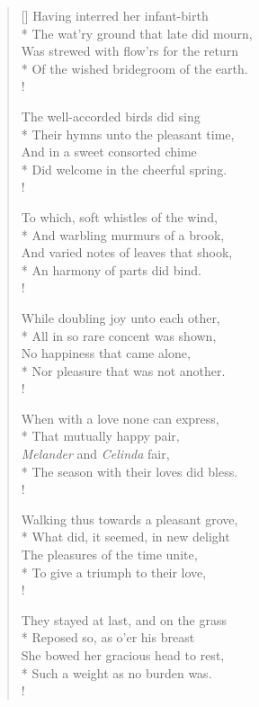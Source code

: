 \documentclass[MAIN]{subfiles}
\begin{document}
\settowidth{\versewidth}{\vin Was strewed with flow'rs for the return}
\begin{verse}[\versewidth]
Having interred her infant-birth\\*
\vin The wat'ry ground that late did mourn,\\
\vin Was strewed with flow'rs for the return\\*
Of the wished bridegroom of the earth.\\!

The well-accorded birds did sing\\*
\vin Their hymns unto the pleasant time,\\
\vin And in a sweet consorted chime\\*
Did welcome in the cheerful spring.\\!

To which, soft whistles of the wind,\\*
\vin And warbling murmurs of a brook,\\
\vin And varied notes of leaves that shook,\\*
An harmony of parts did bind.\\!

While doubling joy unto each other,\\*
\vin All in so rare concent was shown,\\
\vin No happiness that came alone,\\*
Nor pleasure that was not another.\\!

When with a love none can express,\\*
\vin That mutually happy pair,\\
\vin \emph{Melander} and \emph{Celinda} fair,\\*
The season with their loves did bless.\\!

Walking thus towards a pleasant grove,\\*
\vin What did, it seemed, in new delight\\
\vin The pleasures of the time unite,\\*
To give a triumph to their love,\\!

They stayed at last, and on the grass\\*
\vin Reposed so, as o'er his breast\\
\vin She bowed her gracious head to rest,\\*
Such a weight as no burden was.\\!


\end{verse}
\end{document}
